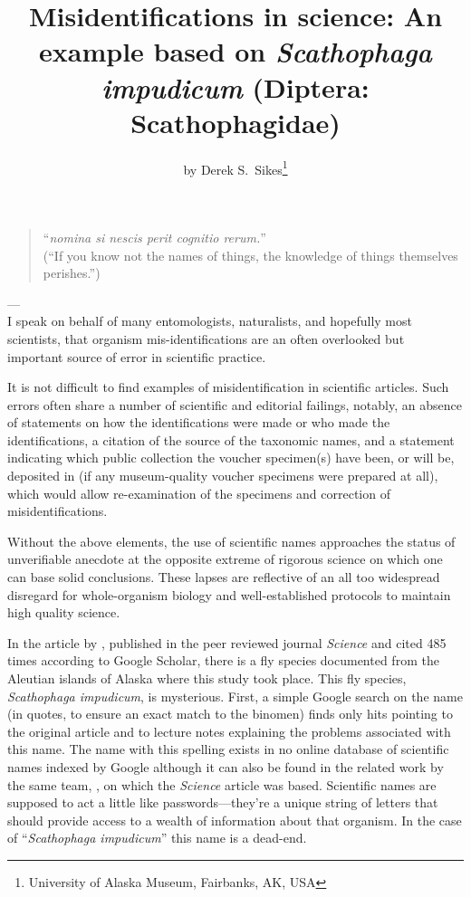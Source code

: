 \title{Misidentifications in science: An example based on \textit{Scathophaga impudicum}  (Diptera: Scathophagidae)}

\subtitle{}

\author{by Derek S.\ Sikes\footnote{University of Alaska Museum, Fairbanks, AK, USA}}

\maketitle

\begin{quotation}
``{\itshape nomina si nescis perit cognitio rerum.}''\\
(``If you know not the names of things, the knowledge of things themselves perishes.'')
\end{quotation}

\hfill---\citet{Coke1628}
\\

I speak on behalf of many entomologists, naturalists, and hopefully most scientists, that organism mis-identifications are an often overlooked but important source of error in scientific practice.

It is not difficult to find examples of misidentification in scientific articles. Such errors often share a number of scientific and editorial failings, notably, an absence of statements on how the identifications were made or who made the identifications, a citation of the source of the taxonomic names, and a statement indicating which public collection the voucher specimen(s) have been, or will be, deposited in (if any museum-quality voucher specimens were prepared at all), which would allow re-examination of the specimens and correction of misidentifications. 

Without the above elements, the use of scientific names approaches the status of unverifiable anecdote at the opposite extreme of rigorous science on which one can base solid conclusions. These lapses are reflective of an all too widespread disregard for whole-organism biology and well-established protocols to maintain high quality science.

In the article by \citet{Croll2005}, published in the peer reviewed journal \textit{Science} and cited 485 times according to Google Scholar, there is a fly species documented from the Aleutian islands of Alaska where this study took place. This fly species, \textit{Scathophaga impudicum}, is mysterious. First, a simple Google search on the name (in quotes, to ensure an exact match to the binomen) finds only hits pointing to the original article and to lecture notes explaining the problems associated with this name. The name with this spelling exists in no online database of scientific names indexed by Google although it can also be found in the related work by the same team, \citet{Maronetal2006}, on which the \textit{Science} article was based. Scientific names are supposed to act a little like passwords---they’re a unique string of letters that should provide access to a wealth of information about that organism. In the case of “\textit{Scathophaga impudicum}” this name is a dead-end.

